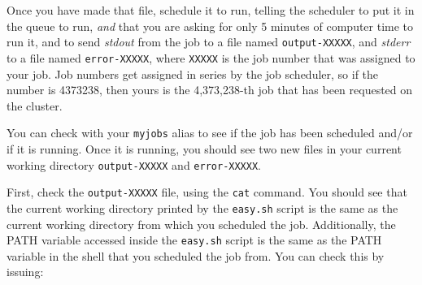 \documentclass[]{krantz}
\makeatletter
\newenvironment{Shaded}{\begin{snugshade}}{\end{snugshade}}
\newcommand{\BuiltInTok}[1]{#1}
\newcommand{\CommentTok}[1]{\textcolor[rgb]{0.37,0.37,0.37}{\textit{#1}}}
\newcommand{\ExtensionTok}[1]{#1}
\newcommand{\FunctionTok}[1]{\textcolor[rgb]{0,0,0}{#1}}
\newcommand{\NormalTok}[1]{#1}
\newcommand{\OperatorTok}[1]{\textcolor[rgb]{0.43,0.43,0.43}{\textbf{#1}}}
\newcommand{\StringTok}[1]{\textcolor[rgb]{0.5,0.5,0.5}{#1}}
\newcommand{\VariableTok}[1]{\textcolor[rgb]{0,0,0}{#1}}
\newenvironment{kframe}{%
\medskip{}
\setlength{\fboxsep}{.8em}
 \def\at@end@of@kframe{}%
 \ifinner\ifhmode%
  \def\at@end@of@kframe{\end{minipage}}%
  \begin{minipage}{\columnwidth}%
 \fi\fi%
 \def\FrameCommand##1{\hskip\@totalleftmargin \hskip-\fboxsep
 \colorbox{shadecolor}{##1}\hskip-\fboxsep
     \hskip-\linewidth \hskip-\@totalleftmargin \hskip\columnwidth}%
 \MakeFramed {\advance\hsize-\width
   \@totalleftmargin\z@ \linewidth\hsize
   \@setminipage}}%
 {\par\unskip\endMakeFramed%
 \at@end@of@kframe}
\renewenvironment{Shaded}{\begin{kframe}}{\end{kframe}}
\makeatother
\begin{document}
\begin{Shaded}
\end{Shaded}

Once you have made that file, schedule it to run, telling the scheduler
to put it in the queue to run, \emph{and} that you are asking for only
5 minutes of computer time to run it, and to send \emph{stdout} from the
job to a file named \texttt{output-XXXXX}, and \emph{stderr} to a file named
\texttt{error-XXXXX}, where \texttt{XXXXX} is the job number that was assigned to your job.
Job numbers get assigned in series by the job scheduler, so if the number
is 4373238, then yours is the 4,373,238-th job that has been requested
on the cluster.

\begin{Shaded}
\end{Shaded}

You can check with your \texttt{myjobs} alias to see if the job has been scheduled
and/or if it is running. Once it is running, you should see two new files
in your current working directory \texttt{output-XXXXX} and \texttt{error-XXXXX}.

First, check the \texttt{output-XXXXX} file, using the \texttt{cat} command. You should
see that the current working directory printed by the \texttt{easy.sh} script
is the same as the current working directory from which you scheduled
the job. Additionally, the PATH variable accessed inside the \texttt{easy.sh} script
is the same as the PATH variable in the shell that you scheduled
the job from. You can check this by issuing:
\end{document}
